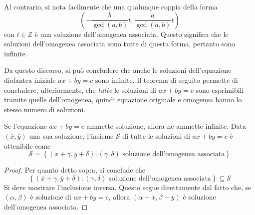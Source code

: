 \documentclass[11pt, a4paper]{scrartcl}
\theoremstyle{definition}
\numberwithin{esempio}{section}
\theoremstyle{definition}
\numberwithin{obs}{section}
\numberwithin{nota}{section}
\numberwithin{equation}{subsection}
\begin{document}
Al contrario, si nota facilmente che una qualunque coppia della forma 
\[
\left( - \frac{b}{\operatorname{gcd}(a,b) }t , \frac{a}{\operatorname{gcd}(a,b) }t\right)
\] 
con $ t \in \mathbb{Z} $ \`e una soluzione dell'omogenea associata. 
Questo significa che le soluzioni dell'omogenea associata sono tutte di questa forma, pertanto sono infinite.

Da questo discorso, si pu\`o concludere che anche le soluzioni dell'equazione diofantea iniziale $ax + by = c$ sono infinite. 
Il teorema di seguito permette di concludere, ulteriormente, che \textit{tutte} le soluzioni di $ax + by = c$ sono esprimibili tramite quelle dell'omogenea, quindi equazione originale e omogenea hanno lo stesso numero di soluzioni.
\begin{teorema}
	{}{}
	Se l'equazione $ax + by = c$ ammette soluzione, allora ne ammette infinite. Data $(\overline{x}, \overline{y})$ una sua soluzione, l'insieme $\mathcal{S} $ di tutte le soluzioni di $ax +by = c$ \`e ottenibile come
	\[
	\mathcal{S}  = \left\{ (\overline{x}+\gamma, \overline{y}+\delta ) : (\gamma, \delta ) \text{ soluzione dell'omogenea associata}\right\} 
	\] 
	\begin{proof}
		Per quanto detto sopra, si conclude che 
		\[
		\left\{(\overline{x}+\gamma, \overline{y}+\delta ) : (\gamma, \delta ) \text{ soluzione dell'omogenea associata}  \right\} \subseteq \mathcal{S} 
		\] 
		Si deve mostrare l'inclusione inversa.
		Questo segue direttamente dal fatto che, se $(\alpha ,\beta )$ \`e soluzione di $ax + by = c$, allora $(\alpha -\overline{x}, \beta - \overline{y})$ \`e soluzione dell'omogenea associata.
	\end{proof}
\end{teorema}
\end{document}

